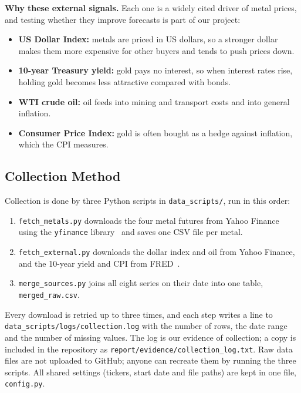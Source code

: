 \textbf{Why these external signals.} Each one is a widely cited driver of metal
prices, and testing whether they improve forecasts is part of our project:
\begin{itemize}
  \item \textbf{US Dollar Index:} metals are priced in US dollars, so a stronger
        dollar makes them more expensive for other buyers and tends to push
        prices down.
  \item \textbf{10-year Treasury yield:} gold pays no interest, so when
        interest rates rise, holding gold becomes less attractive compared with
        bonds.
  \item \textbf{WTI crude oil:} oil feeds into mining and transport costs and
        into general inflation.
  \item \textbf{Consumer Price Index:} gold is often bought as a hedge against
        inflation, which the CPI measures.
\end{itemize}

\subsection{Collection Method}

Collection is done by three Python scripts in \texttt{data\_scripts/}, run in
this order:
\begin{enumerate}
  \item \texttt{fetch\_metals.py} downloads the four metal futures from Yahoo
        Finance using the \texttt{yfinance} library~\cite{a_yfinance} and saves
        one CSV file per metal.
  \item \texttt{fetch\_external.py} downloads the dollar index and oil from
        Yahoo Finance, and the 10-year yield and CPI from FRED~\cite{a_fred}.
  \item \texttt{merge\_sources.py} joins all eight series on their date into one
        table, \texttt{merged\_raw.csv}.
\end{enumerate}

Every download is retried up to three times, and each step writes a line to
\texttt{data\_scripts/\allowbreak logs/\allowbreak collection.log} with the number of rows, the date
range and the number of missing values. The log is our evidence of collection;
a copy is included in the repository as \texttt{report/\allowbreak evidence/\allowbreak collection\_log.txt}.
Raw data files are not uploaded to GitHub; anyone can recreate them by running
the three scripts. All shared settings (tickers, start date and file paths) are
kept in one file, \texttt{config.py}.

